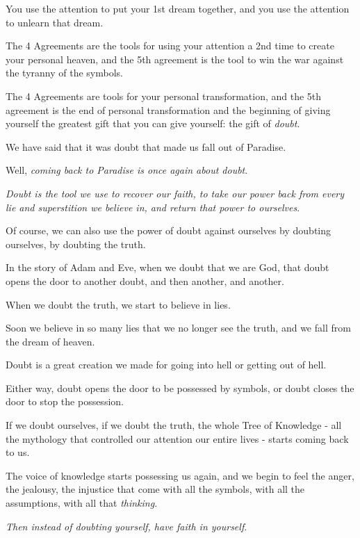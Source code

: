 \documentclass{article}
\numberwithin{equation}{section}
\begin{document}
You use the attention to put your 1st dream together, and you use the attention to unlearn that dream.

%
The 4 Agreements are the tools for using your attention a 2nd time to create your personal heaven, and the 5th agreement is the tool to win the war against the tyranny of the symbols.

The 4 Agreements are tools for your personal transformation, and the 5th agreement is the end of personal transformation and the beginning of giving yourself the greatest gift that you can give yourself: the gift of \textit{doubt}.

%
We have said that it was doubt that made us fall out of Paradise.

Well, \textit{coming back to Paradise is once again about doubt}.

\textit{Doubt is the tool we use to recover our faith, to take our power back from every lie and superstition we believe in, and return that power to ourselves}.

Of course, we can also use the power of doubt against ourselves by doubting ourselves, by doubting the truth.

In the story of Adam and Eve, when we doubt that we are God, that doubt opens the door to another doubt, and then another, and another.

When we doubt the truth, we start to believe in lies.

Soon we believe in so many lies that we no longer see the truth, and we fall from the dream of heaven.

%
Doubt is a great creation we made for going into hell or getting out of hell.

Either way, doubt opens the door to be possessed by symbols, or doubt closes the door to stop the possession.

If we doubt ourselves, if we doubt the truth, the whole Tree of Knowledge - all the mythology that controlled our attention our entire lives - starts coming back to us.

The voice of knowledge starts possessing us again, and we begin to feel the anger, the jealousy, the injustice that come with all the symbols, with all the assumptions, with all that \textit{thinking}.

%
\textit{Then instead of doubting yourself, have faith in yourself}.


\end{document}
